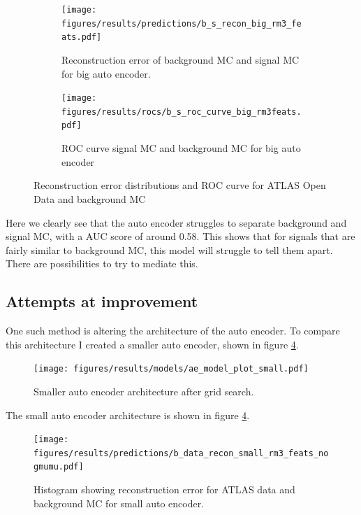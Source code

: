 \documentclass[ reprint, amsmath,amssymb, aps, nofootinbib]{revtex4-2}
\begin{document}
\begin{figure}[h]
     \centering
     \begin{subfigure}[b]{0.46\textwidth}
        \centering
    \texttt{[image: figures/results/predictions/b\_s\_recon\_big\_rm3\_feats.pdf]}
    \caption{Reconstruction error of background MC and signal MC for big auto encoder.  }
    \label{fig:s_b_big_pred}
     \end{subfigure}
     \hfill
     \begin{subfigure}[b]{0.46\textwidth}
         \centering
         \texttt{[image: figures/results/rocs/b\_s\_roc\_curve\_big\_rm3feats.pdf]}
         \caption{ROC curve signal MC and background MC for big auto encoder}
         \label{fig:s_b_big_roc}
     \end{subfigure}
     
        \caption{Reconstruction error distributions and ROC curve for ATLAS Open Data and background MC}
        \label{fig:roc_sig_big_allsig_nogmumu}
\end{figure}

Here we clearly see that the auto encoder struggles to separate background and signal MC, with a AUC score of around 0.58. This shows that for signals that are fairly similar to background MC, this model will struggle to tell them apart. There are possibilities to try to mediate this. 

\subsection{Attempts at improvement}

One such method is altering the architecture of the auto encoder. To compare this architecture I created a smaller auto encoder, shown in figure \ref{fig:small_ae_plot}.

\begin{figure}[h]
    \centering
    \texttt{[image: figures/results/models/ae\_model\_plot\_small.pdf]}
    \caption{Smaller auto encoder architecture after grid search. }
    \label{fig:small_ae_plot}
\end{figure}

The small auto encoder architecture is shown in figure \ref{fig:small_ae_plot}.


\begin{figure}[h]
     \centering
         \texttt{[image: figures/results/predictions/b\_data\_recon\_small\_rm3\_feats\_nogmumu.pdf]}
         \caption{Histogram showing reconstruction error for ATLAS data and background MC for small auto encoder. }
     \label{fig:data_b_small_pred}
\end{figure}
\end{document}
